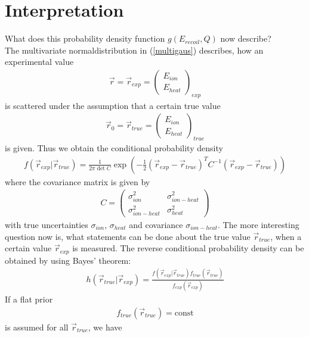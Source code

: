 \section{Interpretation}
What does this probability density function $g(E_{recoil},Q)$ now describe? \\
The multivariate normaldistribution in (\ref{multigaus}) describes, how an experimental value
\begin{gather}
\vec{r} = \vec{r}_{exp} = \begin{pmatrix} E_{ion} \\ E_{heat} \end{pmatrix}_{exp}
\end{gather}
is scattered under the assumption that a certain true value
\begin{gather}
\vec{r}_0 = \vec{r}_{true} = \begin{pmatrix} E_{ion} \\ E_{heat} \end{pmatrix}_{true}
\end{gather}
is given.
Thus we obtain the conditional probability density
\begin{gather}
f(\vec{r}_{exp} | \vec{r}_{true}) = \frac{1}{2 \pi \det C} \exp \left( - \frac{1}{2} (\vec{r}_{exp} - \vec{r}_{true})^{T} C^{-1} (\vec{r}_{exp} - \vec{r}_{true}) \right) \label{condexptrue}
\end{gather}
where the covariance matrix is given by 
\begin{gather}
C = \begin{pmatrix} \sigma_{ion}^2 & \sigma_{ion-heat}^2 \\ \sigma_{ion-heat}^2 & \sigma_{heat}^2 \end{pmatrix}
\end{gather}
with true uncertainties $\sigma_{ion}$, $\sigma_{heat}$ and covariance $\sigma_{ion-heat}$.
The more interesting question now is, what statements can be done about the true value $\vec{r}_{true}$, when a certain value $\vec{r}_{exp}$ is measured.
The reverse conditional probability density can be obtained by using Bayes' theorem:
\begin{gather}
h(\vec{r}_{true} | \vec{r}_{exp}) = \frac{f(\vec{r}_{exp} | \vec{r}_{true}) f_{true} (\vec{r}_{true})}{f_{exp} (\vec{r}_{exp})}
\end{gather}
If a flat prior
\begin{gather}
f_{true}(\vec{r}_{true}) = \mbox{const}
\end{gather}
is assumed for all $\vec{r}_{true}$,
we have 

